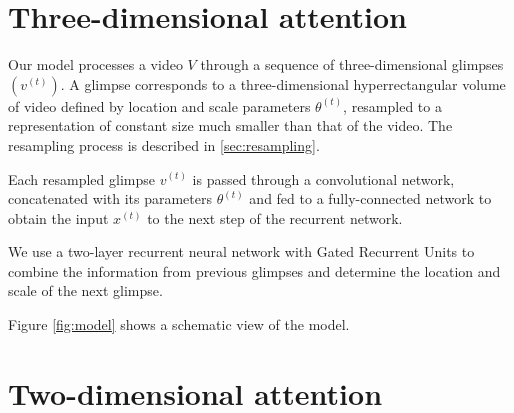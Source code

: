 \documentclass{article} %
\begin{document}
\section{Three-dimensional attention}

Our model processes a video $V$ through a sequence of three-dimensional glimpses $\left(v^{(t)}\right)$.
A glimpse corresponds to a three-dimensional hyperrectangular volume of video defined by location and scale parameters $\theta^{(t)}$, resampled to a representation of constant size much smaller than that of the video.
The resampling process is described in \ref{sec:resampling}.

Each resampled glimpse $v^{(t)}$ is passed through a convolutional network, concatenated with its parameters $\theta^{(t)}$ and fed to a fully-connected network to obtain the input $x^{(t)}$ to the next step of the recurrent network.

We use a two-layer recurrent neural network with Gated Recurrent Units\cite{Cho2014} to combine the information from previous glimpses and determine the location and scale of the next glimpse.

Figure \ref{fig:model} shows a schematic view of the model.



\section{Two-dimensional attention}
\end{document}
